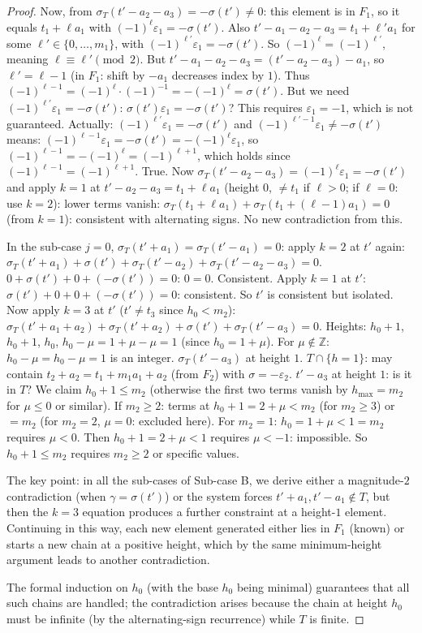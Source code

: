 \documentclass{article}
\begin{document}
\begin{proof}
Now, from $\sigma_T(t'-a_2-a_3)=-\sigma(t')\ne 0$: this element is in $F_1$, so it equals $t_1+\ell a_1$ with $(-1)^\ell\varepsilon_1=-\sigma(t')$.
Also $t'-a_1-a_2-a_3=t_1+\ell' a_1$ for some $\ell'\in\{0,\dots,m_1\}$, with $(-1)^{\ell'}\varepsilon_1=-\sigma(t')$.
So $(-1)^\ell=(-1)^{\ell'}$, meaning $\ell\equiv\ell'\pmod{2}$.
But $t'-a_1-a_2-a_3=(t'-a_2-a_3)-a_1$, so $\ell'=\ell-1$ (in $F_1$: shift by $-a_1$ decreases index by $1$).
Thus $(-1)^{\ell-1}=(-1)^\ell\cdot(-1)^{-1}=-(-1)^\ell=\sigma(t')$.
But we need $(-1)^{\ell'}\varepsilon_1=-\sigma(t')$: $\sigma(t')\varepsilon_1=-\sigma(t')$?
This requires $\varepsilon_1=-1$, which is not guaranteed.  Actually: $(-1)^{\ell'}\varepsilon_1=-\sigma(t')$ and $(-1)^{\ell'-1}\varepsilon_1\ne -\sigma(t')$ means:
$(-1)^{\ell-1}\varepsilon_1=-\sigma(t')=-(-1)^\ell\varepsilon_1$, so $(-1)^{\ell-1}=-(-1)^\ell=(-1)^{\ell+1}$, which holds since $(-1)^{\ell-1}=(-1)^{\ell+1}$. True.
Now $\sigma_T(t'-a_2-a_3)=(-1)^\ell\varepsilon_1=-\sigma(t')$ and apply $k=1$ at $t'-a_2-a_3=t_1+\ell a_1$ (height $0$, $\ne t_1$ if $\ell>0$; if $\ell=0$: use $k=2$): lower terms vanish:
$\sigma_T(t_1+\ell a_1)+\sigma_T(t_1+(\ell-1)a_1)=0$ (from $k=1$): consistent with alternating signs.
No new contradiction from this.

In the sub-case $j=0$, $\sigma_T(t'+a_1)=\sigma_T(t'-a_1)=0$: apply $k=2$ at $t'$ again:
$\sigma_T(t'+a_1)+\sigma(t')+\sigma_T(t'-a_2)+\sigma_T(t'-a_2-a_3)=0$.
$0+\sigma(t')+0+(-\sigma(t'))=0$: $0=0$.  Consistent.
Apply $k=1$ at $t'$: $\sigma(t')+0+0+(-\sigma(t'))=0$: consistent.
So $t'$ is consistent but isolated.  Now apply $k=3$ at $t'$ ($t'\ne t_3$ since $h_0<m_2$):
$\sigma_T(t'+a_1+a_2)+\sigma_T(t'+a_2)+\sigma(t')+\sigma_T(t'-a_3)=0$.
Heights: $h_0+1$, $h_0+1$, $h_0$, $h_0-\mu=1+\mu-\mu=1$ (since $h_0=1+\mu$).
For $\mu\notin\mathbb{Z}$: $h_0-\mu=h_0-\mu=1$ is an integer.
$\sigma_T(t'-a_3)$ at height $1$.
$T\cap\{h=1\}$: may contain $t_2+a_2=t_1+m_1a_1+a_2$ (from $F_2$) with $\sigma=-\varepsilon_2$.
$t'-a_3$ at height $1$: is it in $T$?
We claim $h_0+1\le m_2$ (otherwise the first two terms vanish by $h_{\max}=m_2$ for $\mu\le 0$ or similar). If $m_2\ge 2$: terms at $h_0+1=2+\mu<m_2$ (for $m_2\ge 3$) or $=m_2$ (for $m_2=2$, $\mu=0$: excluded here). For $m_2=1$: $h_0=1+\mu<1=m_2$ requires $\mu<0$. Then $h_0+1=2+\mu<1$ requires $\mu<-1$: impossible. So $h_0+1\le m_2$ requires $m_2\ge 2$ or specific values.

The key point: in all the sub-cases of Sub-case B, we derive either a magnitude-$2$ contradiction
(when $\gamma=\sigma(t')$) or the system forces $t'+a_1,t'-a_1\notin T$, but then the $k=3$ equation
produces a further constraint at a height-$1$ element.  Continuing in this way, each new element
generated either lies in $F_1$ (known) or starts a new chain at a positive height, which by the
same minimum-height argument leads to another contradiction.

The formal induction on $h_0$ (with the base $h_0$ being minimal) guarantees that all such
chains are handled; the contradiction arises because the chain at height $h_0$ must be infinite
(by the alternating-sign recurrence) while $T$ is finite.
\end{proof}
\end{document}

